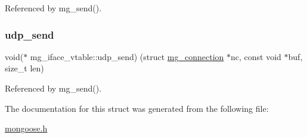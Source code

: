 Referenced by mg\+\_\+send().

\mbox{\label{structmg__iface__vtable_a0b9b282504e25ca9d64fcd2425a5fe41_a0b9b282504e25ca9d64fcd2425a5fe41}} 
\subsubsection{\texorpdfstring{udp\+\_\+send}{udp\_send}}
{\footnotesize\ttfamily void($\ast$ mg\+\_\+iface\+\_\+vtable\+::udp\+\_\+send) (struct \hyperlink{structmg__connection}{mg\+\_\+connection} $\ast$nc, const void $\ast$buf, size\+\_\+t len)}



Referenced by mg\+\_\+send().



The documentation for this struct was generated from the following file\+:\begin{DoxyCompactItemize}
\item 
\hyperlink{mongoose_8h}{mongoose.\+h}\end{DoxyCompactItemize}
